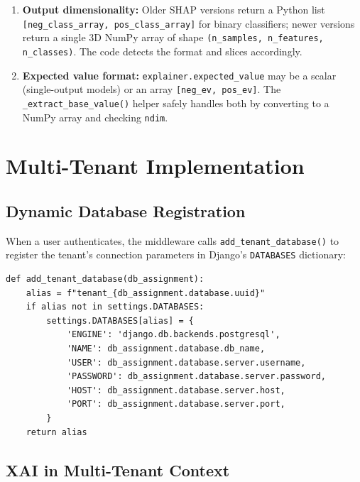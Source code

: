 \documentclass[12pt,a4paper]{report}
\begin{document}
\begin{enumerate}[label=\arabic*.]
  \item \textbf{Output dimensionality:} Older SHAP versions return a Python list \texttt{[neg\_class\_array, pos\_class\_array]} for binary classifiers; newer versions return a single 3D NumPy array of shape \texttt{(n\_samples, n\_features, n\_classes)}. The code detects the format and slices accordingly.

  \item \textbf{Expected value format:} \texttt{explainer.expected\_value} may be a scalar (single-output models) or an array \texttt{[neg\_ev, pos\_ev]}. The \texttt{\_extract\_base\_value()} helper safely handles both by converting to a NumPy array and checking \texttt{ndim}.
\end{enumerate}

\section{Multi-Tenant Implementation}
\label{sec:mt_implementation}

\subsection{Dynamic Database Registration}

When a user authenticates, the middleware calls \texttt{add\_tenant\_database()} to register the tenant's connection parameters in Django's \texttt{DATABASES} dictionary:

\begin{lstlisting}[caption={Dynamic tenant database registration},label={lst:add_tenant_db}]
def add_tenant_database(db_assignment):
    alias = f"tenant_{db_assignment.database.uuid}"
    if alias not in settings.DATABASES:
        settings.DATABASES[alias] = {
            'ENGINE': 'django.db.backends.postgresql',
            'NAME': db_assignment.database.db_name,
            'USER': db_assignment.database.server.username,
            'PASSWORD': db_assignment.database.server.password,
            'HOST': db_assignment.database.server.host,
            'PORT': db_assignment.database.server.port,
        }
    return alias
\end{lstlisting}

\subsection{XAI in Multi-Tenant Context}
\end{document}
